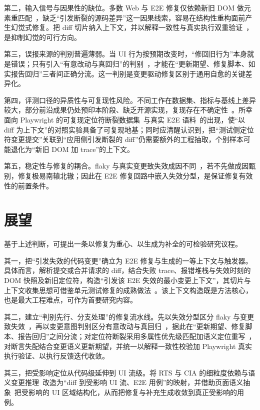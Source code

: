 \documentclass[11pt,a4paper]{article}
\begin{document}
第二，输入信号与因果性的缺位。多数 Web 与 E2E 修复仅依赖新旧 DOM 做元素重匹配~\cite{selfhealingreview,fixwebui}，缺乏“引发断裂的源码差异”这一因果线索，容易在结构性重构面前产生幻觉式修复。把 diff 切片纳入上下文，并以解释一致性与真实执行双重验证~\cite{fixwebui,utfix}，是抑制幻觉的可行方向。

第三，误报来源的判别普遍薄弱。当 UI 行为按预期改变时，“修回旧行为”本身就是错误；只有引入“有意改动与真回归”的判别~\cite{testora}，才能在“更新期望、修复脚本、如实报告回归”三者间正确分流。这一判别是变更驱动修复区别于通用自愈的关键差异化。

第四，评测口径的异质性与可复现性风险。不同工作在数据集、指标与基线上差异较大，部分前沿成果仍处预印本阶段、缺乏开源实现，复现存在不确定性~\cite{practicallimits}。所幸面向 Playwright 的可复现定位符断裂数据集~\cite{reprobreak}与真实 E2E 语料~\cite{e2egit}的出现，使“以 diff 为上下文”的对照实验具备了可复现地基；同时应清醒认识到，把“测试侧定位符变更提交”关联到“应用侧引发断裂的 diff”仍需要额外的工程抽取，个别样本可能退化为“新旧 DOM 加 trace”的上下文。

第五，稳定性与修复的耦合。flaky 与真实变更致失效成因不同~\cite{wefix,flakyguard}，若不先做成因甄别，修复极易南辕北辙；因此在 E2E 修复回路中嵌入失效分型，是保证修复有效性的前置条件。

\section{展望}

基于上述判断，可提出一条以修复为重心、以生成为补全的可检验研究议程。

其一，把“引发失效的代码变更”确立为 E2E 修复与生成的一等上下文与触发器。具体而言，解析提交或合并请求的 diff，结合失败 trace、报错堆栈与失效时刻的 DOM 快照及新旧定位符，构造“引发该 E2E 失效的最小变更上下文”，其切片与上下文收集思想可借鉴单元测试修复的成熟做法~\cite{utfix,fixthetests}。该上下文构造既是方法核心，也是最大工程难点，可作为首要研究内容。

其二，建立“判别先行、分支处理”的修复流水线。先以失效分型区分 flaky 与变更致失效~\cite{flakyguard}，再以变更意图判别区分有意改动与真回归~\cite{testora}，据此在“更新期望、修复脚本、报告回归”之间分流；对定位符断裂采用多属性优先级匹配加语义定位重写~\cite{fixwebui}，对断言失配结合变更语义更新期望，并统一以解释一致性校验加 Playwright 真实执行验证、以执行反馈迭代收敛。

其三，把受影响定位从代码级延伸到 UI 流级。将 RTS 与 CIA 的细粒度依赖与语义变更推理~\cite{preciserts,microscope,namerts}改造为“diff 到受影响 UI 流、E2E 用例”的映射，并借助页面语义抽象~\cite{visca,screentransition}把受影响的 UI 区域结构化，从而把修复与补充生成收敛到真正受影响的用例。
\end{document}
